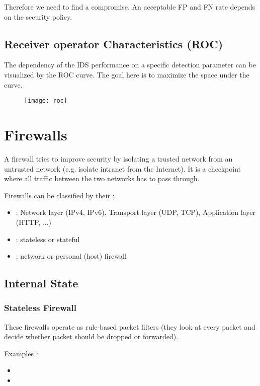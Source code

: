 Therefore we need to find a compromise. An acceptable FP and FN rate depends on the security policy.

\section{Receiver operator Characteristics (ROC)}

The dependency of the IDS performance on a specific detection parameter can be visualized by the ROC curve. The goal here is to maximize the space under the curve.

\begin{figure}[H]
    \centering
    \texttt{[image: roc]}
\end{figure}

\chapter{Firewalls}

A firewall tries to improve security by isolating a trusted network from an untrusted network (e.g. isolate intranet from the Internet). It is a checkpoint where all traffic between the two networks has to pass through.

Firewalls can be classified by their :
\begin{itemize}
    \item {} : Network layer (IPv4, IPv6), Transport layer (UDP, TCP), Application layer (HTTP, ...)
    \item {} : stateless or stateful
    \item {} : network or personal (host) firewall
\end{itemize}

\section{Internal State}

\subsection{Stateless Firewall}

These firewalls operate as rule-based packet filters (they look at every packet and decide whether packet should be dropped or forwarded).

Examples :
\begin{itemize}
    \item {}
    \item {}
\end{itemize}

